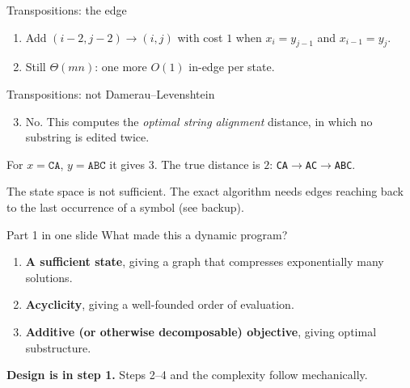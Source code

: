 \begin{frame}{Transpositions: the edge}
	\begin{enumerate}
		\item Add $(i-2,j-2)\to(i,j)$ with cost $1$ when $x_i=y_{j-1}$ and $x_{i-1}=y_j$.
		\item Still $\Theta(mn)$: one more $O(1)$ in-edge per state.
	\end{enumerate}
\end{frame}

\begin{frame}{Transpositions: not Damerau--Levenshtein}
	\begin{enumerate}
		\setcounter{enumi}{2}
		\item \alert{No.} This computes the \emph{optimal string alignment} distance, in which no substring is edited twice.
	\end{enumerate}

	\vspace{0.5em}
	For $x=\texttt{CA}$, $y=\texttt{ABC}$ it gives $3$.
	The true distance is $2$: \texttt{CA}$\to$\texttt{AC}$\to$\texttt{ABC}.

	\seprule

	The state space is \alert{not sufficient}. The exact algorithm needs edges reaching back to the
	last occurrence of a symbol (see backup).
\end{frame}

\begin{frame}{Part 1 in one slide}
	What made this a dynamic program?
	\begin{enumerate}
		\item \textbf{A sufficient state}, giving a graph that compresses exponentially many solutions.
		\item \textbf{Acyclicity}, giving a well-founded order of evaluation.
		\item \textbf{Additive (or otherwise decomposable) objective}, giving optimal substructure.
	\end{enumerate}

	\seprule

	\textbf{Design is in step 1.} Steps 2--4 and the complexity follow mechanically.
\end{frame}
